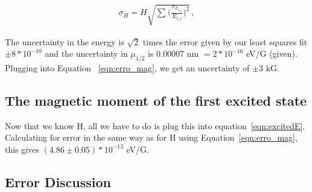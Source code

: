 \documentclass[letterpaper,12pt]{article}
\begin{document}
\begin{eqnarray}
        \sigma_{\si{H}} = H\sqrt{\sum_{} \bigg(\frac{\sigma_{\si{E_{i,j}}}}{E_{\si{i,j}}}\bigg)^2}
        \label{eqn:erro_mag} \,,
\end{eqnarray}

The uncertainty in the energy is $\sqrt{2}$ times the error given by our least squares fit \rightarrow{} $\pm8*10^{-10}$ and the uncertainty in $\mu_{1/2}$ is 0.00007 nm $=2*10^{-16}$ eV/G (given). Plugging into Equation ~\ref{eqn:erro_mag}, we get an uncertainty of $\pm3$ kG.


\subsection{The magnetic moment of the first excited state}

Now that we know H, all we have to do is plug this into equation~\ref{eqn:excitedE}. Calculating for error in the same way as for H using Equation~\ref{eqn:erro_mag}, this gives $(4.86\pm0.05)*10^{-13}$ eV/G.


\subsection{Error Discussion}
    
\end{document}
